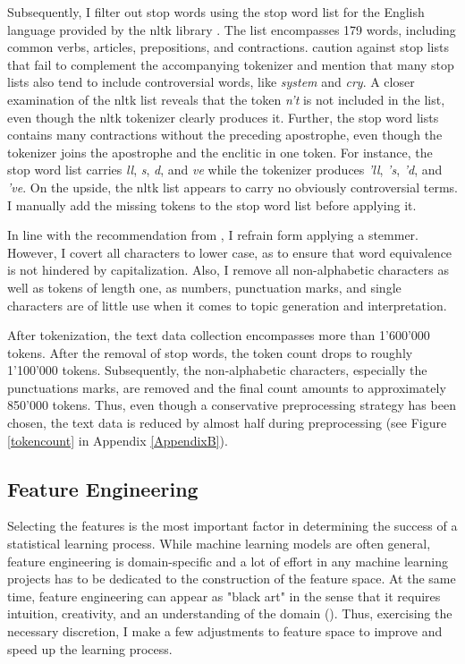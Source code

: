 \documentclass[11pt,a4paper,english,oneside]{book}
\numberwithin{equation}{chapter}
\begin{document}
Subsequently, I filter out stop words using the stop word list for the English language provided by the nltk library \citep{Bird.2010}. The list encompasses 179 words, including common verbs, articles, prepositions, and contractions. \citet[pp. 8--9]{Nothman.2018} caution against stop lists that fail to complement the accompanying tokenizer and mention that many stop lists also tend to include controversial words, like \textit{system} and \textit{cry}. A closer examination of the nltk list reveals that the token \textit{n't} is not included in the list, even though the nltk tokenizer clearly produces it. Further, the stop word lists contains many contractions without the preceding apostrophe, even though the tokenizer joins the apostrophe and the enclitic in one token. For instance, the stop word list carries \textit{ll}, \textit{s}, \textit{d}, and \textit{ve} while the tokenizer produces \textit{'ll}, \textit{'s}, \textit{'d}, and \textit{'ve}. On the upside, the nltk list appears to carry no obviously controversial terms. I manually add the missing tokens to the stop word list before applying it. 

In line with the recommendation from \cite{Schofield.2017}, I refrain form applying a stemmer. However, I covert all characters to lower case, as to ensure that word equivalence is not hindered by capitalization. Also, I remove all non-alphabetic characters as well as tokens of length one, as numbers, punctuation marks, and single characters are of little use when it comes to topic generation and interpretation. 

After tokenization, the text data collection encompasses more than 1'600'000 tokens. After the removal of stop words, the token count drops to roughly 1'100'000 tokens. Subsequently, the non-alphabetic characters, especially the punctuations marks, are removed and the final count amounts to approximately 850'000 tokens. Thus, even though a conservative preprocessing strategy has been chosen, the text data is reduced by almost half during preprocessing (see Figure \ref{tokencount} in Appendix \ref{AppendixB}).

\subsection{Feature Engineering}\label{featueeng}
Selecting the features is the most important factor in determining the success of a statistical learning process. While machine learning models are often general, feature engineering is domain-specific and a lot of effort in any machine learning projects has to be dedicated to the construction of the feature space. At the same time, feature engineering can appear as "black art" in the sense that it requires intuition, creativity, and an understanding of the domain (\citealp{Domingos.2012}). Thus, exercising the necessary discretion, I make a few adjustments to feature space to improve and speed up the learning process. 
\end{document}
